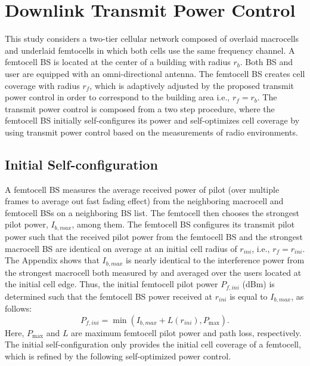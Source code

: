 \documentclass[draftclsnofoot,12pt,onecolumn]{IEEEtran}
\begin{document}
\section{Downlink Transmit Power Control}\label{sec:TPC}

This study considers a two-tier cellular network composed of
overlaid macrocells and underlaid femtocells in which both cells use
the same frequency channel. A femtocell BS is located at the center
of a building with radius $r_b$. Both BS and user are equipped with
an omni-directional antenna. The femtocell BS creates cell coverage
with radius $r_f$, which is adaptively adjusted by the proposed
transmit power control in order to correspond to the building area
i.e., $r_f=r_b$. The transmit power control is composed from a two
step procedure, where the femtocell BS initially self-configures its
power and self-optimizes cell coverage by using transmit power
control based on the measurements of radio environments.

\subsection{Initial Self-configuration}
A femtocell BS measures the average received power of pilot (over
multiple frames to average out fast fading effect) from the
neighboring macrocell and femtocell BSs on a neighboring BS list.
The femtocell then chooses the strongest pilot power, $I_{b,max}$,
among them. The femtocell BS configures its transmit pilot power
such that the received pilot power from the femtocell BS and the
strongest macrocell BS are identical on average at an initial cell
radius of $r_{ini}$, i.e., $r_f=r_{ini}$. The Appendix shows that
$I_{b,max}$ is nearly identical to the interference power from the
strongest macrocell both measured by and averaged over the users
located at the initial cell edge. Thus, the initial femtocell pilot
power $P_{f,ini}$ (dBm) is determined such that the femtocell BS
power received at $r_{ini}$ is equal to $I_{b,max}$, as follows:
\begin{equation}
P_{f,ini}=\min\left(I_{b,max}+L\left(r_{ini}\right),
P_{\max}\right).\label{eq:InitPw}
\end{equation}
Here, $P_{\max}$ and $L$ are maximum femtocell pilot power and path
loss, respectively. The initial self-configuration only provides the
initial cell coverage of a femtocell, which is refined by the
following self-optimized power control.
\end{document}
